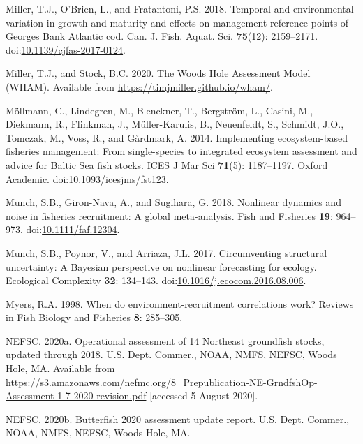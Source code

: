\documentclass[]{article}
\begin{document}
\leavevmode\hypertarget{ref-miller2018Temporal}{}%
Miller, T.J., O'Brien, L., and Fratantoni, P.S. 2018. Temporal and
environmental variation in growth and maturity and effects on management
reference points of Georges Bank Atlantic cod. Can. J. Fish. Aquat. Sci.
\textbf{75}(12): 2159--2171.
doi:\href{https://doi.org/10.1139/cjfas-2017-0124}{10.1139/cjfas-2017-0124}.

\leavevmode\hypertarget{ref-miller2020Woods}{}%
Miller, T.J., and Stock, B.C. 2020. The Woods Hole Assessment Model
(WHAM). Available from \url{https://timjmiller.github.io/wham/}.

\leavevmode\hypertarget{ref-mollmann2014Implementing}{}%
Möllmann, C., Lindegren, M., Blenckner, T., Bergström, L., Casini, M.,
Diekmann, R., Flinkman, J., Müller-Karulis, B., Neuenfeldt, S., Schmidt,
J.O., Tomczak, M., Voss, R., and Gårdmark, A. 2014. Implementing
ecosystem-based fisheries management: From single-species to integrated
ecosystem assessment and advice for Baltic Sea fish stocks. ICES J Mar
Sci \textbf{71}(5): 1187--1197. Oxford Academic.
doi:\href{https://doi.org/10.1093/icesjms/fst123}{10.1093/icesjms/fst123}.

\leavevmode\hypertarget{ref-munch2018Nonlinear}{}%
Munch, S.B., Giron-Nava, A., and Sugihara, G. 2018. Nonlinear dynamics
and noise in fisheries recruitment: A global meta-analysis. Fish and
Fisheries \textbf{19}: 964--973.
doi:\href{https://doi.org/10.1111/faf.12304}{10.1111/faf.12304}.

\leavevmode\hypertarget{ref-munch2017Circumventing}{}%
Munch, S.B., Poynor, V., and Arriaza, J.L. 2017. Circumventing
structural uncertainty: A Bayesian perspective on nonlinear forecasting
for ecology. Ecological Complexity \textbf{32}: 134--143.
doi:\href{https://doi.org/10.1016/j.ecocom.2016.08.006}{10.1016/j.ecocom.2016.08.006}.

\leavevmode\hypertarget{ref-myers1998When}{}%
Myers, R.A. 1998. When do environment-recruitment correlations work?
Reviews in Fish Biology and Fisheries \textbf{8}: 285--305.

\leavevmode\hypertarget{ref-nefsc2020Operational}{}%
NEFSC. 2020a. Operational assessment of 14 Northeast groundfish stocks,
updated through 2018. U.S. Dept. Commer., NOAA, NMFS, NEFSC, Woods Hole,
MA. Available from
\url{https://s3.amazonaws.com/nefmc.org/8_Prepublication-NE-GrndfshOp-Assessment-1-7-2020-revision.pdf}
{[}accessed 5 August 2020{]}.

\leavevmode\hypertarget{ref-nefsc2020Butterfish}{}%
NEFSC. 2020b. Butterfish 2020 assessment update report. U.S. Dept.
Commer., NOAA, NMFS, NEFSC, Woods Hole, MA.
\end{document}
